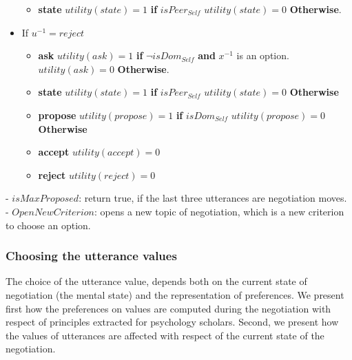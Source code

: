 \documentclass{article}
\begin{document}
\begin{itemize}
\begin{itemize}
	\item \textbf{ state}
		\subitem $utility(state) = 1$ \textbf{ if } $isPeer_{Self}$
		\subitem $utility(state) = 0$ \textbf{Otherwise}.
	\\		
	\end{itemize}
	\item If $u^{-1}=reject$
	\begin{itemize}
		\item \textbf{ask}	
			\subitem $utility(ask) =1 $ \textbf{ if } $\neg isDom_{Self}$ \textbf{ and } $x^{-1}$ is an option.
			\subitem $utility(ask) = 0$ \textbf{Otherwise}.
		\item \textbf{state}
			\subitem $utility(state) = 1$ \textbf{ if } $isPeer_{Self}$
			\subitem $utility(state) = 0$ \textbf{ Otherwise}
		\item \textbf{propose}
			\subitem $utility(propose) = 1$ \textbf{ if } $isDom_{Self}$
			\subitem $utility(propose) = 0$ \textbf{Otherwise}
		\item \textbf{accept}
			\subitem $utility(accept) = 0$
		\item \textbf{reject}	
			\subitem $utility(reject) =0 $	
	\end{itemize}
	
\end{itemize}

- $isMaxProposed$: return true, if the last three utterances are negotiation moves.
- $OpenNewCriterion$: opens a new topic of negotiation, which is a new criterion to choose an option.


\subsubsection{Choosing the utterance values}
The choice of the utterance value, depends both on the current state of negotiation (the mental state) and the representation of preferences. We present first how the preferences on values are computed during the negotiation with respect of principles extracted for psychology scholars. 
Second, we present how the values of utterances are affected with respect of the current state of the negotiation.
\end{document}

